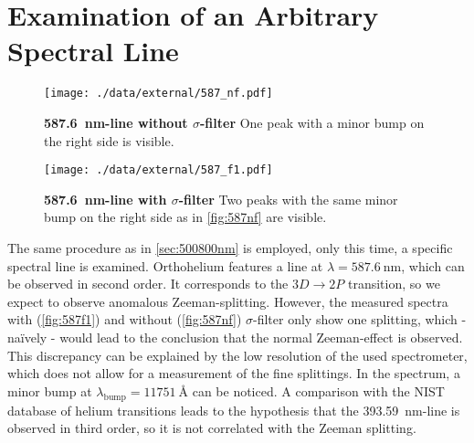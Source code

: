 \section{Examination of an Arbitrary Spectral Line}
\begin{figure}[tbp]
	\centering
	\texttt{[image: ./data/external/587\_nf.pdf]}
	\caption[\SI{587.6}{\nm}-line w/o $\sigma$-filter]{\textbf{\SI{587.6}{\nm}-line without $\sigma$-filter} One peak with a minor bump on the right side is visible.}
	\label{fig:587nf}
\end{figure}
\begin{figure}[tbp]
	\centering
	\texttt{[image: ./data/external/587\_f1.pdf]}
	\caption[\SI{587.6}{\nm}-line with $\sigma$-filter]{\textbf{\SI{587.6}{\nm}-line with $\sigma$-filter} Two peaks with the same minor bump on the right side as in \autoref{fig:587nf} are visible.}
	\label{fig:587f1}
\end{figure}
The same procedure as in \autoref{sec:500800nm} is employed, only this time, a specific spectral line is examined.
Orthohelium features a line at $\lambda=\SI{587.6}{\nm}$\cite{hetrans}, which can be observed in second order.
It corresponds to the $3D\rightarrow 2P$ transition, so we expect to observe anomalous Zeeman-splitting.
However, the measured spectra with (\autoref{fig:587f1}) and without (\autoref{fig:587nf}) $\sigma$-filter only show one splitting, which - na\"ively - would lead to the conclusion that the normal Zeeman-effect is observed.
This discrepancy can be explained by the low resolution of the used spectrometer, which does not allow for a measurement of the fine splittings.
In the spectrum, a minor bump at $\lambda_\text{bump}=\SI{11751}{\angstrom}$ can be noticed.
A comparison with the NIST database of helium transitions \cite{hetrans} leads to the hypothesis that the \SI{393.59}{\nm}-line is observed in third order, so it is not correlated with the Zeeman splitting.
